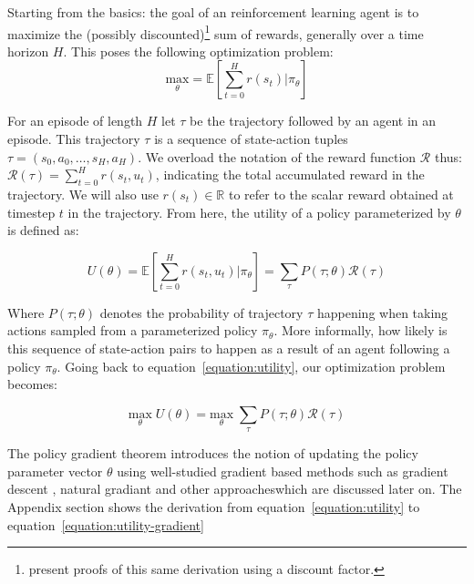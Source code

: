 \documentclass{../main.tex}{subfiles}
\begin{document}
Starting from the basics: the goal of an reinforcement learning agent is to maximize the (possibly discounted)\footnote{\cite{Williams1992, Sutton1999} present proofs of this same derivation using a discount factor.} sum of rewards, generally over a time horizon $H$. This poses the following optimization problem:
\begin{equation}\label{equation:expected-reward-theta}
\underset{\theta}{\text{max}} = \mathbb{E}[\sum^{H}_{t=0} r(s_t) | \pi_{\theta}]
\end{equation}

For an episode of length $H$ let $\tau$ be the trajectory followed by an agent in an episode. This trajectory $\tau$ is a sequence of state-action tuples $\tau = (s_0, a_0, \dots, s_H, a_H)$. We overload the notation of the reward function $\mathcal{R}$ thus: $\mathcal{R}(\tau) = \sum_{t=0}^{H}r(s_t, u_t)$, indicating the total accumulated reward in the trajectory. We will also use $r(s_t) \in \mathbb{R}$ to refer to the scalar reward obtained at timestep $t$ in the trajectory. From here, the utility of a policy parameterized by $\theta$ is defined as:

\begin{equation}\label{equation:utility}
U(\theta) = \mathbb{E}[\sum_{t=0}^{H}r(s_t, u_t) | \pi_{\theta}] = \sum_{\tau}P(\tau ; \theta)\mathcal{R}(\tau)
\end{equation}

Where $P(\tau ; \theta)$ denotes the probability of trajectory $\tau$ happening when taking actions sampled from a parameterized policy $\pi_{\theta}$. More informally, how likely is this sequence of state-action pairs to happen as a result of an agent following a policy $\pi_{\theta}$. Going back to equation~\ref{equation:utility}, our optimization problem becomes:

\begin{equation}\label{equation:utility-optimization}
\underset{\theta}{\text{max}}\; U(\theta) = \underset{\theta}{\text{max}}\; \sum_{\tau}P(\tau ; \theta)\mathcal{R}(\tau)
\end{equation}

The policy gradient theorem \citep{Williams1992, Sutton1999} introduces the notion of updating the policy parameter vector $\theta$ using well-studied gradient based methods such as gradient descent \citep{Schulman2017,Mnih2013}, natural gradiant \citep{Wu2017} and other approacheswhich are discussed later on. The Appendix section shows the derivation from equation~\ref{equation:utility} to equation~\ref{equation:utility-gradient}
\end{document}
